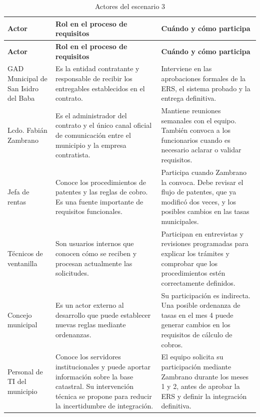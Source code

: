 \documentclass[12pt,a4paper]{article}
\begin{document}
\begin{longtable}{
>{\raggedright\arraybackslash}p{3.0cm}
>{\raggedright\arraybackslash}p{5.2cm}
>{\raggedright\arraybackslash}p{6.7cm}
}

\caption{Actores del escenario 3}\\
\toprule
\textbf{Actor} &
\textbf{Rol en el proceso de requisitos} &
\textbf{Cuándo y cómo participa} \\
\midrule
\endfirsthead

\toprule
\textbf{Actor} &
\textbf{Rol en el proceso de requisitos} &
\textbf{Cuándo y cómo participa} \\
\midrule
\endhead

GAD Municipal de San Isidro del Baba &
Es la entidad contratante y responsable de recibir
los entregables establecidos en el contrato. &
Interviene en las aprobaciones formales de la ERS,
el sistema probado y la entrega definitiva. \\
\midrule

Lcdo. Fabián Zambrano &
Es el administrador del contrato y el único canal
oficial de comunicación entre el municipio y la
empresa contratista. &
Mantiene reuniones semanales con el equipo.
También convoca a los funcionarios cuando
es necesario aclarar o validar requisitos. \\
\midrule

Jefa de rentas &
Conoce los procedimientos de patentes y las reglas
de cobro. Es una fuente importante de requisitos
funcionales. &
Participa cuando Zambrano la convoca. Debe revisar
el flujo de patentes, que ya modificó dos veces,
y los posibles cambios en las tasas municipales. \\
\midrule

Técnicos de ventanilla &
Son usuarios internos que conocen cómo se reciben
y procesan actualmente las solicitudes. &
Participan en entrevistas y revisiones programadas
para explicar los trámites y comprobar que
los procedimientos estén correctamente definidos. \\
\midrule

Concejo municipal &
Es un actor externo al desarrollo que puede
establecer nuevas reglas mediante ordenanzas. &
Su participación es indirecta. Una posible
ordenanza de tasas en el mes 4 puede generar
cambios en los requisitos de cálculo de cobros. \\
\midrule

Personal de TI del municipio &
Conoce los servidores institucionales y puede
aportar información sobre la base catastral.
Su intervención técnica se propone para reducir
la incertidumbre de integración. &
El equipo solicita su participación mediante
Zambrano durante los meses 1 y 2, antes de
aprobar la ERS y definir la integración definitiva. \\
\midrule


\end{longtable}
\end{document}
